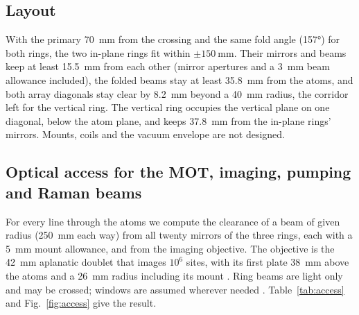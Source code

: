 \documentclass[11pt]{article}
\begin{document}
\subsection{Layout}

With the primary \SI{70}{\milli\metre} from the crossing and the same fold angle (\ang{157}) for both
rings, the two in-plane rings fit within $\pm\SI{150}{\milli\metre}$. Their mirrors and beams keep at least
\SI{15.5}{\milli\metre} from each other (mirror apertures and a \SI{3}{\milli\metre} beam allowance
included), the folded beams stay at least \SI{35.8}{\milli\metre} from the atoms, and both array
diagonals stay clear by \SI{8.2}{\milli\metre} beyond a \SI{40}{\milli\metre} radius, the corridor left
for the vertical ring. The vertical ring occupies the vertical plane on one diagonal, below the atom
plane, and keeps \SI{37.8}{\milli\metre} from the in-plane rings' mirrors. Mounts, coils and the vacuum
envelope are not designed.

\subsection{Optical access for the MOT, imaging, pumping and Raman beams}

For every line through the atoms we compute the clearance of a beam of given radius
(\SI{250}{\milli\metre} each way) from all twenty mirrors of the three rings, each with a
\SI{5}{\milli\metre} mount allowance, and from the imaging objective. The objective is the
\SI{42}{\milli\metre} aplanatic doublet that images $10^{6}$ sites, with its first plate
\SI{38}{\milli\metre} above the atoms and a \SI{26}{\milli\metre} radius including its mount
\placeholder{[CONFIRM?]}. Ring beams are light only and may be crossed; windows are assumed wherever
needed . Table~\ref{tab:access} and Fig.~\ref{fig:access} give the
result.
\end{document}
